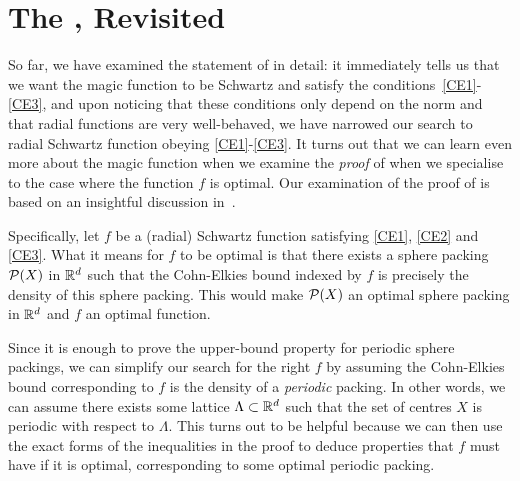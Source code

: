 \section{The \CELP, Revisited}
\label{Ch3:Sec:Cohn_Elkies_Revisited}

So far, we have examined the statement of  in detail: it immediately tells us that we want the magic function to be Schwartz and satisfy the conditions~\ref{CE1}-\ref{CE3}, and upon noticing that these conditions only depend on the norm and that radial functions are very well-behaved, we have narrowed our search to radial Schwartz function obeying \ref{CE1}-\ref{CE3}. It turns out that we can learn even more about the magic function when we examine the \textit{proof} of  when we specialise to the case where the function $f$ is optimal. Our examination of the proof of  is based on an insightful discussion in~\cite[p. 8]{CohnOnViazovskaICM}.

Specifically, let $f$ be a (radial) Schwartz function satisfying \ref{CE1}, \ref{CE2} and \ref{CE3}. What it means for $f$ to be optimal is that there exists a sphere packing $\mathcal{P}(X)$ in $\mathbb{R}^d$ such that the Cohn-Elkies bound indexed by $f$ is precisely the density of this sphere packing. This would make $\mathcal{P}(X)$ an optimal sphere packing in $\mathbb{R}^d$ and $f$ an optimal function.

Since it is enough to prove the upper-bound property for periodic sphere packings, we can simplify our search for the right $f$ by assuming the Cohn-Elkies bound corresponding to $f$ is the density of a \textit{periodic} packing. In other words, we can assume there exists some lattice $\Lambda \subset \mathbb{R}^d$ such that the set of centres $X$ is periodic with respect to $\Lambda$. This turns out to be helpful because we can then use the exact forms of the inequalities in the proof to deduce properties that $f$ must have if it is optimal, corresponding to some optimal periodic packing.

